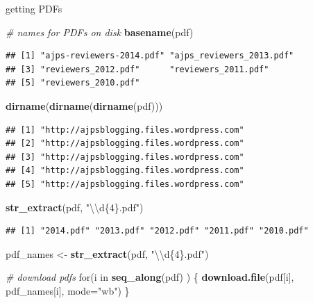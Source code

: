 \documentclass[ignorenonframetext,]{beamer}
\newenvironment{Shaded}{\begin{snugshade}}{\end{snugshade}}
\newcommand{\KeywordTok}[1]{\textcolor[rgb]{0.13,0.29,0.53}{\textbf{{#1}}}}
\newcommand{\DataTypeTok}[1]{\textcolor[rgb]{0.13,0.29,0.53}{{#1}}}
\newcommand{\CharTok}[1]{\textcolor[rgb]{0.31,0.60,0.02}{{#1}}}
\newcommand{\StringTok}[1]{\textcolor[rgb]{0.31,0.60,0.02}{{#1}}}
\newcommand{\CommentTok}[1]{\textcolor[rgb]{0.56,0.35,0.01}{\textit{{#1}}}}
\newcommand{\NormalTok}[1]{{#1}}
\begin{document}
\begin{frame}[fragile]{getting PDFs}

\begin{Shaded}
\begin{Highlighting}[]
\CommentTok{# names for PDFs on disk}
\KeywordTok{basename}\NormalTok{(pdf)}
\end{Highlighting}
\end{Shaded}

\begin{verbatim}
## [1] "ajps-reviewers-2014.pdf" "ajps_reviewers_2013.pdf"
## [3] "reviewers_2012.pdf"      "reviewers_2011.pdf"     
## [5] "reviewers_2010.pdf"
\end{verbatim}

\begin{Shaded}
\begin{Highlighting}[]
\KeywordTok{dirname}\NormalTok{(}\KeywordTok{dirname}\NormalTok{(}\KeywordTok{dirname}\NormalTok{(pdf)))}
\end{Highlighting}
\end{Shaded}

\begin{verbatim}
## [1] "http://ajpsblogging.files.wordpress.com"
## [2] "http://ajpsblogging.files.wordpress.com"
## [3] "http://ajpsblogging.files.wordpress.com"
## [4] "http://ajpsblogging.files.wordpress.com"
## [5] "http://ajpsblogging.files.wordpress.com"
\end{verbatim}

\begin{Shaded}
\begin{Highlighting}[]
\KeywordTok{str_extract}\NormalTok{(pdf, }\StringTok{"}\CharTok{\textbackslash{}\textbackslash{}}\StringTok{d\{4\}.pdf"}\NormalTok{)}
\end{Highlighting}
\end{Shaded}

\begin{verbatim}
## [1] "2014.pdf" "2013.pdf" "2012.pdf" "2011.pdf" "2010.pdf"
\end{verbatim}

\begin{Shaded}
\begin{Highlighting}[]
\NormalTok{pdf_names <-}\StringTok{ }\KeywordTok{str_extract}\NormalTok{(pdf, }\StringTok{"}\CharTok{\textbackslash{}\textbackslash{}}\StringTok{d\{4\}.pdf"}\NormalTok{)}
\end{Highlighting}
\end{Shaded}

\begin{Shaded}
\begin{Highlighting}[]
\CommentTok{# download pdfs}
\NormalTok{for(i in }\KeywordTok{seq_along}\NormalTok{(pdf) ) \{}
  \KeywordTok{download.file}\NormalTok{(pdf[i], pdf_names[i], }\DataTypeTok{mode=}\StringTok{"wb"}\NormalTok{)}
\NormalTok{\}}
\end{Highlighting}
\end{Shaded}

\end{frame}
\end{document}
